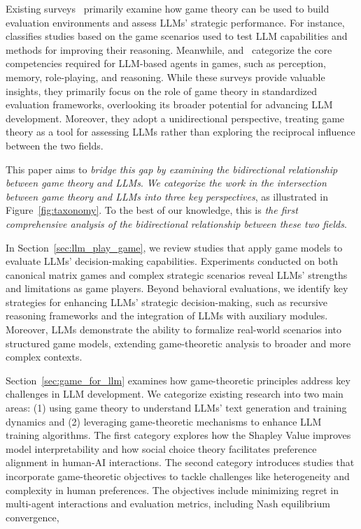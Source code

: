 Existing surveys~\cite{zhang2024llm,feng2024survey,hu2024survey} primarily examine how game theory can be used to build evaluation environments and assess LLMs' strategic performance. 
For instance, \cite{zhang2024llm} classifies studies based on the game scenarios used to test LLM capabilities and methods for improving their reasoning. 
Meanwhile, \cite{feng2024survey} and~\cite{hu2024survey} categorize the core competencies required for LLM-based agents in games, such as perception, memory, role-playing, and reasoning.
While these surveys provide valuable insights, they primarily focus on the role of game theory in standardized evaluation frameworks, overlooking its broader potential for advancing LLM development. 
Moreover, they adopt a unidirectional perspective, treating game theory as a tool for assessing LLMs rather than exploring the reciprocal influence between the two fields.

This paper aims to \emph{bridge this gap by examining the bidirectional relationship between game theory and LLMs}.
\emph{We categorize the work in the intersection between game theory and LLMs into three key perspectives}, as illustrated in Figure~\ref{fig:taxonomy}. 
To the best of our knowledge, this is \emph{the first comprehensive analysis of the bidirectional relationship between these two fields}.

In Section~\ref{sec:llm_play_game}, we review studies that apply game models to evaluate LLMs' decision-making capabilities.
Experiments conducted on both canonical matrix games and complex strategic scenarios reveal LLMs' strengths and limitations as game players. 
Beyond behavioral evaluations, we identify key strategies for enhancing LLMs' strategic decision-making, such as recursive reasoning frameworks and the integration of LLMs with auxiliary modules. 
Moreover, LLMs demonstrate the ability to formalize real-world scenarios into structured game models, extending game-theoretic analysis to broader and more complex contexts.

Section~\ref{sec:game_for_llm} examines how game-theoretic principles address key challenges in LLM development. We categorize existing research into two main areas: (1) using game theory to understand LLMs' text generation and training dynamics and (2) leveraging game-theoretic mechanisms to enhance LLM training algorithms.
The first category explores how the Shapley Value improves model interpretability and how social choice theory facilitates preference alignment in human-AI interactions. 
The second category introduces studies that incorporate game-theoretic objectives to tackle challenges like heterogeneity and complexity in human preferences. The objectives include minimizing regret in multi-agent interactions and evaluation metrics, including Nash equilibrium convergence,

